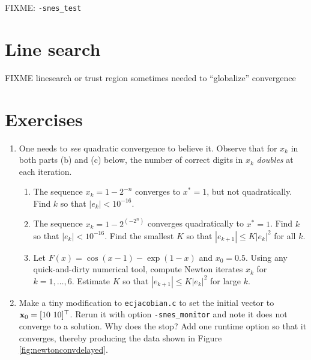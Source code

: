 FIXME: \texttt{-snes\_test}

\section{Line search} \label{sec:linesearch}

FIXME linesearch or trust region sometimes needed to ``globalize'' convergence \citep{Kelley2003}


\section{Exercises}

\renewcommand{\labelenumi}{\arabic{chapter}.\arabic{enumi}\quad}
\renewcommand{\labelenumii}{(\alph{enumii})}
\begin{enumerate}
\item One needs to \emph{see} quadratic convergence to believe it.  Observe that for $x_k$ in both parts (b) and (c) below, the number of correct digits in $x_k$ \emph{doubles} at each iteration.
    \begin{enumerate}
    \item The sequence $x_k = 1-2^{-n}$ converges to $x^*=1$, but not quadratically.  Find $k$ so that $|e_k| < 10^{-16}$.
    \item The sequence $x_k = 1-2^{(-2^n)}$ converges quadratically to $x^*=1$.  Find $k$ so that $|e_k| < 10^{-16}$.  Find the smallest $K$ so that $|e_{k+1}| \le K |e_k|^2$ for all $k$.
    \item Let $F(x) = \cos(x-1) - \exp(1-x)$ and $x_0=0.5$.  Using any quick-and-dirty numerical tool, compute Newton iterates $x_k$ for $k=1,\dots,6$.  Estimate $K$ so that $|e_{k+1}| \le K |e_k|^2$ for large $k$.
    \end{enumerate}

\item Make a tiny modification to \texttt{ecjacobian.c} to set the initial vector to $\mathbf{x}_0 = [10\,\, 10]^\top$.  Rerun it with option \texttt{-snes\_monitor} and note it does not converge to a solution.  Why does the \pSNES stop?  Add one runtime option so that it  converges, thereby producing the data shown in Figure \ref{fig:newtonconvdelayed}.


\end{enumerate}

